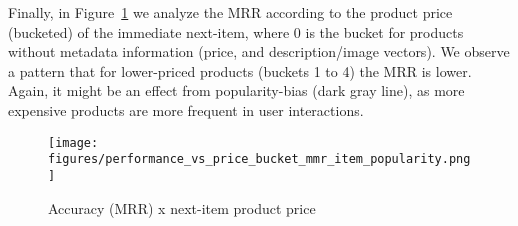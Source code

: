 \documentclass[sigconf,screen]{acmart}
\begin{document}
Finally, in Figure~\ref{fig:mrr_price} we analyze the MRR according to the product price (bucketed) of the immediate next-item, where 0 is the bucket for products without metadata information (price, and description/image vectors). We observe a pattern that for lower-priced products  (buckets 1 to 4) the MRR is lower. Again, it might be an effect from popularity-bias (dark gray line), as more expensive products are more frequent in user interactions.

\begin{figure}[ht]
  \centering
  \texttt{[image: figures/performance\_vs\_price\_bucket\_mmr\_item\_popularity.png]}
  \caption{Accuracy (MRR) x next-item product price}
  \label{fig:mrr_price}
\end{figure}








\end{document}
